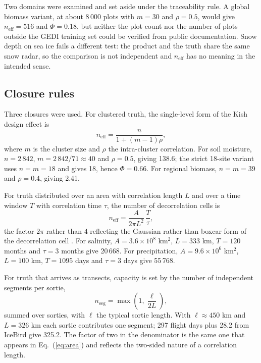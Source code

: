 \documentclass[preprint,12pt,authoryear]{elsarticle}
\begin{document}
Two domains were examined and set aside under the traceability rule. A global biomass variant, at about 8\,000 plots with $m = 30$ and $\rho = 0.5$, would give $n_{\mathrm{eff}} = 516$ and $\Phi = 0.18$, but neither the plot count nor the number of plots outside the GEDI training set could be verified from public documentation. Snow depth on sea ice fails a different test: the product and the truth share the same snow radar, so the comparison is not independent and $n_{\mathrm{eff}}$ has no meaning in the intended sense.

\subsection{Closure rules}
\label{sec:s2b}

Three closures were used. For clustered truth, the single-level form of the Kish design effect is
\begin{equation}
n_{\mathrm{eff}} = \frac{n}{1+(m-1)\rho},
\label{eq:cluster}
\end{equation}
where $m$ is the cluster size and $\rho$ the intra-cluster correlation. For soil moisture, $n = 2\,842$, $m = 2\,842/71 \approx 40$ and $\rho = 0.5$, giving 138.6; the strict 18-site variant uses $n = m = 18$ and gives 18, hence $\Phi = 0.66$. For regional biomass, $n = m = 39$ and $\rho = 0.4$, giving 2.41.

For truth distributed over an area with correlation length $L$ and over a time window $T$ with correlation time $\tau$, the number of decorrelation cells is
\begin{equation}
n_{\mathrm{eff}} = \frac{A}{2\pi L^{2}}\,\frac{T}{\tau},
\label{eq:area}
\end{equation}
the factor $2\pi$ rather than $4$ reflecting the Gaussian rather than boxcar form of the decorrelation cell \citep{bretherton1999effective,zwiers1995taking,kish1965survey}. For salinity, $A = 3.6\times10^{8}$ km$^2$, $L = 333$ km, $T = 120$ months and $\tau = 3$ months give 20\,668. For precipitation, $A = 9.6\times10^{6}$ km$^2$, $L = 100$ km, $T = 1095$ days and $\tau = 3$ days give 55\,768.

For truth that arrives as transects, capacity is set by the number of independent segments per sortie,
\begin{equation}
n_{\mathrm{seg}} = \max\!\left(1, \frac{\ell}{2L}\right),
\label{eq:sortie}
\end{equation}
summed over sorties, with $\ell$ the typical sortie length. With $\ell \approx 450$ km and $L = 326$ km each sortie contributes one segment; 297 flight days plus 28.2 from IceBird give 325.2. The factor of two in the denominator is the same one that appears in Eq.~(\ref{eq:area}) and reflects the two-sided nature of a correlation length.
\end{document}
